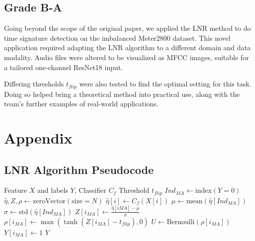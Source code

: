 \documentclass{article}
\begin{document}


\subsection{Grade B-A}

Going beyond the scope of the original paper, we applied the LNR method to do time signature detection on the imbalanced Meter2800 dataset. This novel application required adapting the LNR algorithm to a different domain and data modality. Audio files were altered to be visualized as MFCC images, suitable for a tailored one-channel ResNet18 input.

Differing thresholds $t_{flip}$ were also tested to find the optimal setting for this task. Doing so helped bring a theoretical method into practical use, along with the team's further examples of real-world applications.







\renewcommand\thesubsection{\Alph{subsection}}

\setcounter{subsection}{0}

\section*{Appendix}

\subsection{LNR Algorithm Pseudocode}
\vspace{-0.6\baselineskip}
\label{sec:appendix}
\begin{algorithm}[H]
	\caption{Flip labels in binary classification with noise model $\rho(x)$}
	\label{alg:LNR_flip}
	\begin{algorithmic}[0]
		\REQUIRE Feature $X$ and labels $Y$, Classifier $C_f$
		\REQUIRE Threshold $t_{flip}$
		\STATE $Ind_{MA} \leftarrow \text{index}(Y = 0)$
		\STATE $\hat{\eta}, Z, \rho \leftarrow \text{zeroVector}(\text{size} = N)$
		\STATE $\hat{\eta}[i] \leftarrow C_f(X[i])$
		\ENDFOR
		\STATE $\mu \leftarrow \text{mean}(\hat{\eta}[Ind_{MA}])$
		\STATE $\sigma \leftarrow \text{std}(\hat{\eta}[Ind_{MA}])$
		\STATE $Z[i_{MA}] \leftarrow \frac{\hat{\eta}[i {MA}] - \mu}{\sigma}$
		\STATE $\rho[i_{MA}] \leftarrow \max(\tanh(Z[i_{MA}] - t_{flip}), 0)$
		\STATE $U \leftarrow \text{Bernoulli}(\rho[i_{MA}])$
		\STATE $Y[i_{MA}] \leftarrow 1$
		\ENDIF
		\ENDFOR
		\RETURN $Y$
	\end{algorithmic}
\end{algorithm}
\end{document}

